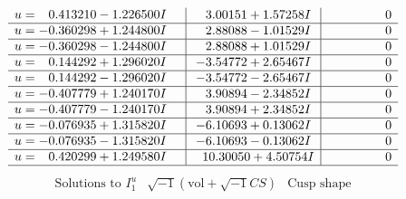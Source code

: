 \documentclass[1p]{elsarticle_modified}
\theoremstyle{definition}
\newcommand{\I}{\sqrt{-1}}
\begin{document}
$$\begin{array}{c|c|c}
\begin{aligned}
u &= \phantom{-}0.413210 - 1.226500 I\end{aligned}
 & \phantom{-}3.00151 + 1.57258 I & \phantom{-0.000000 } 0 \\ \hline\begin{aligned}
u &= -0.360298 + 1.244800 I\end{aligned}
 & \phantom{-}2.88088 - 1.01529 I & \phantom{-0.000000 } 0 \\ \hline\begin{aligned}
u &= -0.360298 - 1.244800 I\end{aligned}
 & \phantom{-}2.88088 + 1.01529 I & \phantom{-0.000000 } 0 \\ \hline\begin{aligned}
u &= \phantom{-}0.144292 + 1.296020 I\end{aligned}
 & -3.54772 + 2.65467 I & \phantom{-0.000000 } 0 \\ \hline\begin{aligned}
u &= \phantom{-}0.144292 - 1.296020 I\end{aligned}
 & -3.54772 - 2.65467 I & \phantom{-0.000000 } 0 \\ \hline\begin{aligned}
u &= -0.407779 + 1.240170 I\end{aligned}
 & \phantom{-}3.90894 - 2.34852 I & \phantom{-0.000000 } 0 \\ \hline\begin{aligned}
u &= -0.407779 - 1.240170 I\end{aligned}
 & \phantom{-}3.90894 + 2.34852 I & \phantom{-0.000000 } 0 \\ \hline\begin{aligned}
u &= -0.076935 + 1.315820 I\end{aligned}
 & -6.10693 + 0.13062 I & \phantom{-0.000000 } 0 \\ \hline\begin{aligned}
u &= -0.076935 - 1.315820 I\end{aligned}
 & -6.10693 - 0.13062 I & \phantom{-0.000000 } 0 \\ \hline\begin{aligned}
u &= \phantom{-}0.420299 + 1.249580 I\end{aligned}
 & \phantom{-}10.30050 + 4.50754 I & \phantom{-0.000000 } 0\\
 \hline 
 \end{array}$$\newpage$$\begin{array}{c|c|c}  
\text{Solutions to }I^u_{1}& \I (\text{vol} + \sqrt{-1}CS) & \text{Cusp shape}\\

\end{array}$$
\end{document}

